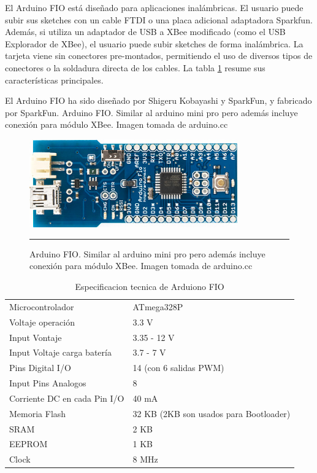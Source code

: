El Arduino FIO está diseñado para aplicaciones inalámbricas. El usuario puede subir sus sketches con un cable FTDI o una placa adicional adaptadora Sparkfun. Además, si utiliza un adaptador de USB a XBee modificado (como el USB Explorador de XBee), el usuario puede subir sketches de forma inalámbrica. La tarjeta viene sin conectores pre-montados, permitiendo el uso de diversos tipos de conectores o la soldadura directa de los cables. La tabla \ref{table:Especificaciones Fio} resume sus características principales.

El Arduino FIO ha sido diseñado por Shigeru Kobayashi y SparkFun, y fabricado por SparkFun.
Arduino FIO. Similar al arduino mini pro pero además incluye conexión para módulo XBee. Imagen tomada de arduino.cc


\begin{figure}[htbp]
	\centering
		\includegraphics[width=0.8\textwidth]{./Figures/MODI/fio.jpg}
		\rule{35em}{0.5pt}
	\caption[fio]{Arduino FIO. Similar al arduino mini pro pero además incluye conexión para módulo XBee. Imagen tomada de arduino.cc}
	\label{fig:fio}
\end{figure}

\begin{table}
    \begin{tabular}{l|l}
    Microcontrolador             & ATmega328P                             \\
    Voltaje operación            & 3.3 V                                  \\
    Input Vontaje                & 3.35 - 12 V                            \\
    Input Voltaje carga batería  & 3.7 - 7 V                              \\
    Pins Digital I/O             & 14 (con 6  salidas PWM)                \\
    Input Pins Analogos          & 8                                      \\
    Corriente DC en cada Pin I/O & 40 mA                                  \\
    Memoria Flash                & 32 KB (2KB son usados para Bootloader) \\
    SRAM                         & 2 KB                                   \\
    EEPROM                       & 1 KB                                   \\
    Clock                        & 8 MHz                                  \\
    \end{tabular}
    \caption[Especificaciones Fio]{Especificacion tecnica de Arduiono FIO}
	\label{table:Especificaciones Fio}
\end{table}

